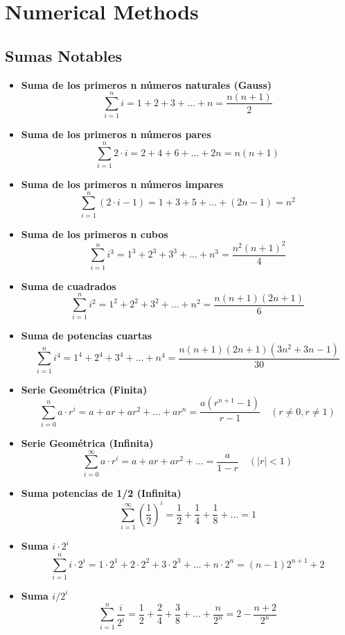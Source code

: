 \section{Numerical Methods}
\subsection{Sumas Notables}
\begin{itemize}
    \item \textbf{Suma de los primeros n números naturales (Gauss)}
    \[ \sum_{i=1}^{n} i = 1 + 2 + 3 + \dots + n = \frac{n(n+1)}{2} \]
    
    \item \textbf{Suma de los primeros n números pares}
    \[ \sum_{i=1}^{n} 2\cdot i = 2 + 4 + 6 + \dots + 2n = n(n+1) \]
    
    \item \textbf{Suma de los primeros n números impares}
    \[ \sum_{i=1}^{n} (2\cdot i - 1) = 1 + 3 + 5 + \dots + (2n - 1) = n^2 \]

    \item \textbf{Suma de los primeros n cubos}
    \[ \sum_{i=1}^{n} i^3 = 1^3 + 2^3 + 3^3 + \dots + n^3 = \frac{n^2(n+1)^2}{4} \]

    \item \textbf{Suma de cuadrados}
    \[ \sum_{i=1}^{n} i^2 = 1^2 + 2^2 + 3^2 + \dots + n^2 = \frac{n(n+1)(2n+1)}{6} \]

    \item \textbf{Suma de potencias cuartas}
    \[ \sum_{i=1}^{n} i^4 = 1^4 + 2^4 + 3^4 + \dots + n^4 = \frac{n(n+1)(2n+1)(3n^2+3n-1)}{30} \]

    \item \textbf{Serie Geométrica (Finita)}
    \[ \sum_{i=0}^{n} a \cdot r^i = a + ar + ar^2 + \dots + ar^n = \frac{a(r^{n+1} - 1)}{r - 1} \quad (r \neq 0, r \neq 1) \]

    \item \textbf{Serie Geométrica (Infinita)}
    \[ \sum_{i=0}^{\infty} a \cdot r^i = a + ar + ar^2 + \dots = \frac{a}{1 - r} \quad (|r| < 1) \]

    \item \textbf{Suma potencias de 1/2 (Infinita)}
    \[ \sum_{i=1}^{\infty} \left(\frac{1}{2}\right)^i = \frac{1}{2} + \frac{1}{4} + \frac{1}{8} + \dots= 1 \]

    \item \textbf{Suma $i \cdot 2^i$}
    \[ \sum_{i=1}^{n} i \cdot 2^i = 1\cdot 2^1 + 2\cdot 2^2 + 3\cdot 2^3 + \dots + n\cdot 2^n = (n - 1)2^{n+1} + 2 \]

    \item \textbf{Suma $i / 2^i$}
    \[ \sum_{i=1}^{n} \frac{i}{2^i} = \frac{1}{2} + \frac{2}{4} + \frac{3}{8} + \dots + \frac{n}{2^n} = 2 - \frac{n+2}{2^n} \]
\end{itemize}

